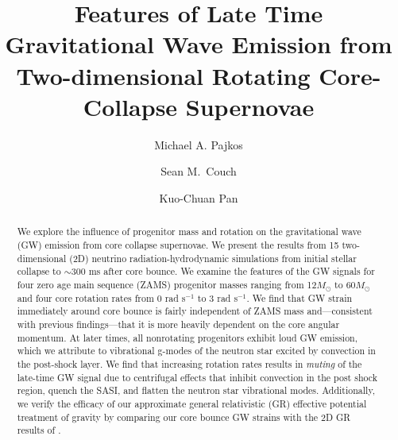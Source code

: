 \documentclass[twocolumn,times]{aastex62}  %
\begin{document}
 


\title{Features of Late Time Gravitational Wave Emission from Two-dimensional Rotating Core-Collapse Supernovae}

\author{Michael A. Pajkos}

\author[0000-0002-5080-5996]{Sean M.~Couch}

\author{Kuo-Chuan Pan}


\received{\today}

 \begin{abstract}
  We explore the influence of progenitor mass and rotation on the gravitational wave (GW) emission from core collapse supernovae.  We present the results from 15 two-dimensional (2D) neutrino radiation-hydrodynamic simulations from initial stellar collapse to $\sim$300 ms after core bounce.  We examine the features of the GW signals for four zero age main sequence (ZAMS) progenitor masses ranging from 12\(M_\odot\) to 60\(M_\odot\) and four core rotation rates from 0 rad s$^{-1}$ to 3 rad s$^{-1}$. We find that GW strain immediately around core bounce is fairly independent of ZAMS mass and---consistent with previous findings---that it is more heavily dependent on the core angular momentum.  At later times, all nonrotating progenitors exhibit loud GW emission, which we attribute to vibrational g-modes of the neutron star excited by convection in the post-shock layer.  We find that increasing rotation rates results in {\it muting} of the late-time GW signal due to centrifugal effects that inhibit convection in the post shock region, quench the SASI, and flatten the neutron star vibrational modes.  Additionally, we verify the efficacy of our approximate general relativistic (GR) effective potential treatment of gravity by comparing our core bounce GW strains with the 2D GR results of \citet{richers:2017}. 
\end{abstract}
\end{document}
